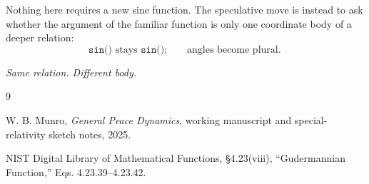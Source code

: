 \documentclass[11pt]{article}
\begin{document}
Nothing here requires a new sine function. The speculative move is instead
to ask whether the argument of the familiar function is only one coordinate
body of a deeper relation:
\begin{equation}
\boxed{
\texttt{sin()}\text{ stays }\texttt{sin()};
\qquad
\text{angles become plural.}
}
\end{equation}

\begin{center}
\emph{Same relation. Different body.}
\end{center}

\begin{thebibliography}{9}

W. B. Munro,
\emph{General Peace Dynamics},
working manuscript and special-relativity sketch notes, 2025.

NIST Digital Library of Mathematical Functions,
\S 4.23(viii), ``Gudermannian Function,''
Eqs. 4.23.39--4.23.42.

\end{thebibliography}
\end{document}
